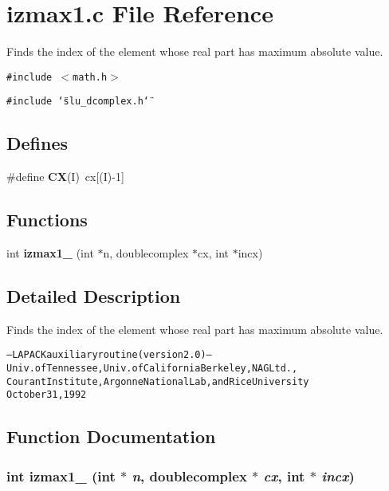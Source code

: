 \section{izmax1.c File Reference}
\label{izmax1_8c}
Finds the index of the element whose real part has maximum absolute value. 

{\tt \#include $<$math.h$>$}\par
{\tt \#include \char`\"{}slu\_\-dcomplex.h\char`\"{}}\par
\subsection*{Defines}
\begin{CompactItemize}
\item 
\#define {\bf CX}(I)~cx[(I)-1]\label{izmax1_8c_5a76da95c549c41790389a76e12fdcb5}

\end{CompactItemize}
\subsection*{Functions}
\begin{CompactItemize}
\item 
int {\bf izmax1\_\-} (int $\ast$n, doublecomplex $\ast$cx, int $\ast$incx)
\end{CompactItemize}


\subsection{Detailed Description}
Finds the index of the element whose real part has maximum absolute value. 

\small\begin{alltt}
     -- LAPACK auxiliary routine (version 2.0) --   
     Univ. of Tennessee, Univ. of California Berkeley, NAG Ltd.,   
     Courant Institute, Argonne National Lab, and Rice University   
     October 31, 1992   
 \end{alltt}\normalsize 
 

\subsection{Function Documentation}
\subsubsection{\setlength{\rightskip}{0pt plus 5cm}int izmax1\_\- (int $\ast$ {\em n}, doublecomplex $\ast$ {\em cx}, int $\ast$ {\em incx})}\label{izmax1_8c_99d3cc85eec418b836a4949ead25c297}


